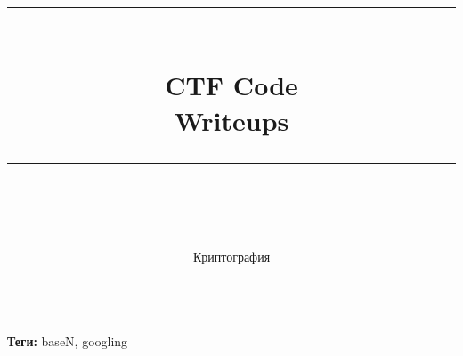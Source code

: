 \documentclass[idxtotoc,hyperref,openany,oneside]{files/crypto} %
\newcommand{\HRule}{\rule{\linewidth}{0.5mm}} %
\begin{document}

\frontmatter %
\title{
\begin{center}
\HRule \\[0.4cm]
{\Huge \bfseries CTF Code \\[0.5cm] \Large Writeups}\\[0.4cm] %
\HRule \\[1.5cm]
\end{center}
}
\author{\Huge Криптография \\ \\[2cm]} %
\maketitle

\tableofcontents

\mainmatter %












\textbf{Теги:} baseN, googling\vspace{\baselineskip}
\end{document}
